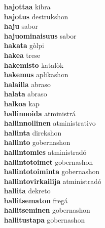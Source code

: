 \textbf{hajottaa } kibra \\
\textbf{hajotus } destrukshon \\
\textbf{haju } sabor \\
\textbf{hajuominaisuus } sabor \\
\textbf{hakata } gòlpi \\
\textbf{hakea } trese \\
\textbf{hakemisto } katalòk \\
\textbf{hakemus } aplikashon \\
\textbf{halailla } abraso \\
\textbf{halata } abraso \\
\textbf{halkoa } kap \\
\textbf{hallinnoida } atministrá \\
\textbf{hallinnollinen } atministrativo \\
\textbf{hallinta } direkshon \\
\textbf{hallinto } gobernashon \\
\textbf{hallintomies } atministradó \\
\textbf{hallintotoimet } gobernashon \\
\textbf{hallintotoiminta } gobernashon \\
\textbf{hallintovirkailija } atministradó \\
\textbf{hallita } dekreto \\
\textbf{hallitsematon } fregá \\
\textbf{hallitseminen } gobernashon \\
\textbf{hallitustapa } gobernashon \\
